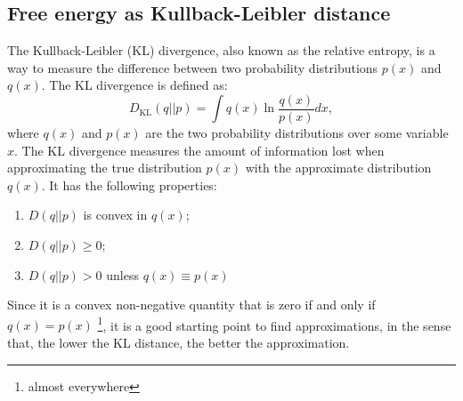 


\subsection{Free energy as Kullback-Leibler distance}

The Kullback-Leibler (KL) divergence, also known as the relative entropy, is a way to measure the difference between two probability distributions $p(x)$ and $q(x)$. The KL divergence is defined as:
\begin{equation}
    D_{\text{KL}}(q||p) = \int q(x) \ln \frac{q(x)}{p(x)} dx,
\end{equation}
where $q(x)$ and $p(x)$ are the two probability distributions over some variable $x$. The KL divergence measures the amount of information lost when approximating the true distribution $p(x)$ with the approximate distribution $q(x)$. It has the following properties:
\begin{enumerate}
 \item $D(q||p)$ is convex in $q(x)$;
 \item $D(q||p) \geq 0$;
 \item $D(q||p) > 0$ unless $q(x) \equiv p(x)$
\end{enumerate}
Since it is a convex non-negative quantity that is zero if and only if $q(x) = p(x)$ \footnote{ almost everywhere}, it is a good starting point to find approximations, in the sense that, the lower the KL distance, the better the approximation.

